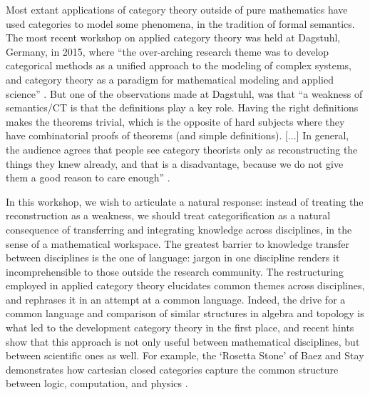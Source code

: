 \documentclass{article}
\newcommand{\redout}[1]{{\color{red}#1}}
\begin{document}
Most extant applications of category theory outside of pure mathematics have used categories to model some phenomena, in the tradition of formal semantics. The most recent workshop on applied category theory was held at Dagstuhl, Germany, in 2015, where ``the over-arching research theme was to develop categorical methods as a unified approach to the modeling of complex systems, and category theory as a paradigm for mathematical modeling and applied science'' \cite{dagstuhl14}. But one of the observations made at Dagstuhl, was that ``a weakness of semantics/CT is that the definitions play a key role. Having the right definitions makes the theorems trivial, which is the opposite of hard subjects where they have combinatorial proofs of theorems (and simple definitions). [...] In general, the audience agrees that people see category theorists only as reconstructing the things they knew already, and that is a disadvantage, because we do not give them a good reason to care enough'' \cite[pg. 61]{dagstuhl14}.

In this workshop, we wish to articulate a natural response: instead of treating the reconstruction as a weakness, we should treat categorification as a natural consequence of transferring and integrating knowledge across disciplines, in the sense of a mathematical workspace. The greatest barrier to knowledge transfer between disciplines is the one of language: jargon in one discipline renders it incomprehensible to those outside the research community. The restructuring employed in applied category theory elucidates common themes across disciplines, and rephrases it in an attempt at a common language. Indeed, the drive for a common language and comparison of similar structures in algebra and topology is what led to the development category theory in the first place, and recent hints show that this approach is not only useful between mathematical disciplines, but between scientific ones as well. For example, the `Rosetta Stone' of Baez and Stay demonstrates how cartesian closed categories capture the common structure between logic, computation, and physics \cite{baez09}. 

\end{document}
